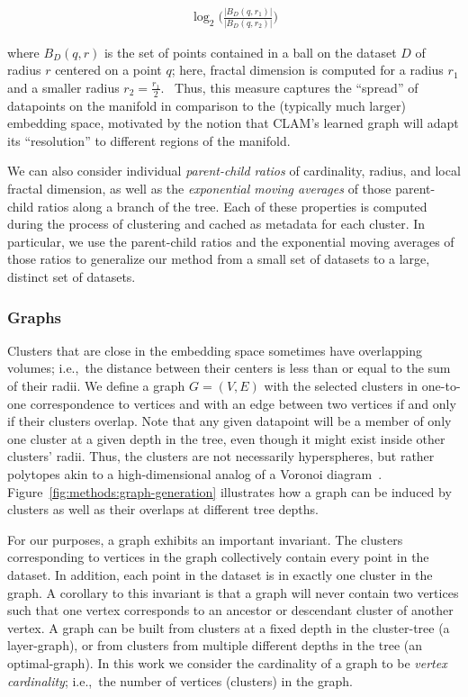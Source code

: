 \begin{gather}
    \log_2\bigg(\frac{|B_D(q, r_1)|}{|B_D(q, r_2)|}\bigg)
    \label{fractal-dimension}
\end{gather}

where $B_D(q,r)$ is the set of points contained in a ball on the dataset $D$ of radius $r$ centered on a point $q$; here, fractal dimension is computed for a radius $r_1$ and a smaller radius $r_2=\frac{r_1}{2}$.~\cite{ishaq2019clustered}
Thus, this measure captures the ``spread'' of datapoints on the manifold in comparison to the (typically much larger) embedding space, motivated by the notion that CLAM's learned graph will adapt its ``resolution'' to different regions of the manifold.


We can also consider individual \textit{parent-child ratios} of cardinality, radius, and local fractal dimension, as well as the \textit{exponential moving averages} of those parent-child ratios along a branch of the tree.
Each of these properties is computed during the process of clustering and cached as metadata for each cluster.
In particular, we use the parent-child ratios and the exponential moving averages of those ratios to generalize our method from a small set of datasets to a large, distinct set of datasets.

\subsubsection{Graphs}
Clusters that are close in the embedding space sometimes have overlapping volumes; i.e.,\ the distance between their centers is less than or equal to the sum of their radii.
We define a graph $G=(V,E)$ with the selected clusters in one-to-one correspondence to vertices and with an edge between two vertices if and only if their clusters overlap.
Note that any given datapoint will be a member of only one cluster at a given depth in the tree, even though it might exist inside other clusters' radii.
Thus, the clusters are not necessarily hyperspheres, but rather polytopes akin to a high-dimensional analog of a Voronoi diagram~\cite{voronoi1908nouvelles}.
Figure~\ref{fig:methods:graph-generation} illustrates how a graph can be induced by clusters as well as their overlaps at different tree depths.

For our purposes, a graph exhibits an important invariant.
The clusters corresponding to vertices in the graph collectively contain every point in the dataset.
In addition, each point in the dataset is in exactly one cluster in the graph.
A corollary to this invariant is that a graph will never contain two vertices such that one vertex corresponds to an ancestor or descendant cluster of another vertex.
A graph can be built from clusters at a fixed depth in the cluster-tree (a layer-graph), or from clusters from multiple different depths in the tree (an optimal-graph).
In this work we consider the cardinality of a graph to be \textit{vertex cardinality}; i.e.,\ the number of vertices (clusters) in the graph.

